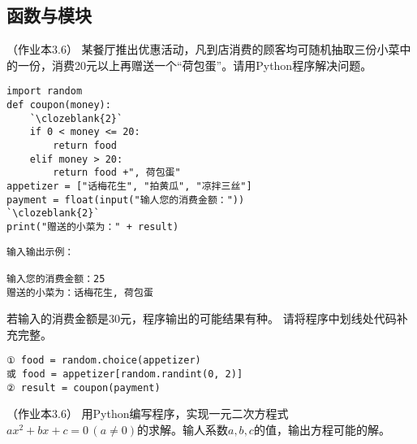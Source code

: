\setcounter{section}{3}
\setcounter{subsection}{5}
\subsection{函数与模块}





\begin{groups}


\begin{questions}[rp]

\setcounter{qnumber}{1}
\question （{\kaishu 作业本3.6}）
某餐厅推出优惠活动，凡到店消费的顾客均可随机抽取三份小菜中的一份，消费20元以上再赠送一个“荷包蛋”。请用Python程序解决问题。 
\begin{paracol}{2}
\begin{lstlisting}
import random
def coupon(money):
    `\clozeblank{2}`
    if 0 < money <= 20:
        return food
    elif money > 20:
        return food +", 荷包蛋"
appetizer = ["话梅花生", "拍黄瓜", "凉拌三丝"]
payment = float(input("输人您的消费金额："))
`\clozeblank{2}`
print("赠送的小菜为：" + result)
\end{lstlisting}
\switchcolumn
\begin{lstlisting}[frame=single]
输入输出示例：

输入您的消费金额：25
赠送的小菜为：话梅花生, 荷包蛋
\end{lstlisting}
\end{paracol}



\begin{subquestions}
\subquestion 若输入的消费金额是30元，程序输出的可能结果有种。
\subquestion 请将程序中划线处代码补充完整。
\end{subquestions}

\begin{solution}
\begin{lstlisting}
① food = random.choice(appetizer)
或 food = appetizer[random.randint(0, 2)]
② result = coupon(payment)
\end{lstlisting}
\end{solution}


\setcounter{qnumber}{1}
\question （{\kaishu 作业本3.6}）
用Python编写程序，实现一元二次方程式$ax^2+bx+c=0 \, (a \ne 0)$的求解。输人系数$a,b,c$的值，输出方程可能的解。


\end{questions}
\end{groups}
